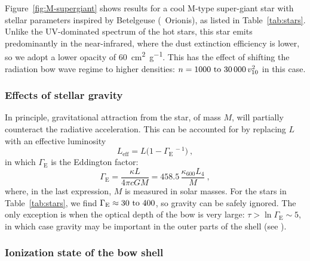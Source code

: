Figure~\ref{fig:M-supergiant} shows results for a cool M-type
super-giant star with stellar parameters inspired by Betelgeuse
(\chemalpha~Orionis), as listed in Table~\ref{tab:stars}.  Unlike the
UV-dominated spectrum of the hot stars, this star emits predominantly
in the near-infrared, where the dust extinction efficiency is lower,
so we adopt a lower opacity of \SI{60}{cm^2.g^{-1}}.  This has the
effect of shifting the radiation bow wave regime to higher densities:
\(n = \text{\numrange{1000}{30 000}}\, v_{10}^2\) in this case.


\subsubsection{Effects of stellar gravity}
\label{sec:effects-gravity}

In principle, gravitational attraction from the star, of mass \(M\),
will partially counteract the radiative acceleration.  This can be
accounted for by replacing \(L\) with an effective luminosity
\newcommand\Edd{\ensuremath{_{\text{E}}}}
\begin{equation}
  \label{eq:effective-luminosity}
  L_{\text{eff}} = L \bigl(1 - \Gamma\Edd^{\,-1}\bigr) \ ,
\end{equation}
in which \(\Gamma\Edd\) is the Eddington factor:
\begin{equation}
  \label{eq:eddington-factor}
  \Gamma\Edd = \frac{\kappa L}{4\pi c G M} = 458.5 \, \frac{\kappa_{600} L_4}{ M } \ ,
\end{equation}
where, in the last expression, \(M\) is measured in solar masses.  For
the stars in Table~\ref{tab:stars}, we find
\(\Gamma\Edd \approx \text{\numrange{30}{400}}\), so gravity can be safely
ignored.  The only exception is when the optical depth of the bow is
very large: \(\tau > \ln\Gamma\Edd \sim 5\), in which case gravity may be
important in the outer parts of the shell (see
\citealt{Rodriguez-Ramirez:2016b}).



\subsubsection{Ionization state of the bow shell}
\label{sec:trapp-ioniz-front}

\newcommand\alphaB{\ensuremath{\alpha_{\text{B}}}}
\newcommand\shell{\ensuremath{_{\text{sh}}}}

